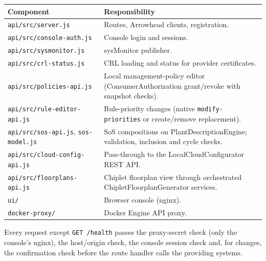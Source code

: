 \documentclass[a4paper]{arrowhead}
\begin{document}
\noindent\begin{longtable}{| p{5.6cm} | p{9.6cm} |} \hline
\rowcolor{gray!33} Component & Responsibility \\ \hline \endhead
\texttt{api/\allowbreak{}src/\allowbreak{}server.\allowbreak{}js} & Routes, Arrowhead clients, registration. \\ \hline
\texttt{api/\allowbreak{}src/\allowbreak{}console-\allowbreak{}auth.\allowbreak{}js} & Console login and sessions. \\ \hline
\texttt{api/\allowbreak{}src/\allowbreak{}sysmonitor.\allowbreak{}js} & sysMonitor publisher. \\ \hline
\texttt{api/\allowbreak{}src/\allowbreak{}crl-\allowbreak{}status.\allowbreak{}js} & CRL loading and status for provider certificates. \\ \hline
\texttt{api/\allowbreak{}src/\allowbreak{}policies-\allowbreak{}api.\allowbreak{}js} & Local management-policy editor (ConsumerAuthorization grant/revoke with snapshot checks). \\ \hline
\texttt{api/\allowbreak{}src/\allowbreak{}rule-\allowbreak{}editor-\allowbreak{}api.\allowbreak{}js} & Rule-priority changes (native \texttt{modify-\allowbreak{}priorities} or create/remove replacement). \\ \hline
\texttt{api/\allowbreak{}src/\allowbreak{}sos-\allowbreak{}api.\allowbreak{}js}, \texttt{sos-\allowbreak{}model.\allowbreak{}js} & SoS compositions on PlantDescriptionEngine; validation, inclusion and cycle checks. \\ \hline
\texttt{api/\allowbreak{}src/\allowbreak{}cloud-\allowbreak{}config-\allowbreak{}api.\allowbreak{}js} & Pass-through to the LocalCloudConfigurator REST API. \\ \hline
\texttt{api/\allowbreak{}src/\allowbreak{}floorplans-\allowbreak{}api.\allowbreak{}js} & Chiplet floorplan view through orchestrated ChipletFloorplanGenerator services. \\ \hline
\texttt{ui/\allowbreak{}} & Browser console (nginx). \\ \hline
\texttt{docker-\allowbreak{}proxy/\allowbreak{}} & Docker Engine API proxy. \\ \hline
\end{longtable}

Every request except \texttt{GET /health} passes the proxy-secret check (only the console's nginx), the host/origin check, the console session check and, for changes, the confirmation check before the route handler calls the providing systems.
\end{document}
